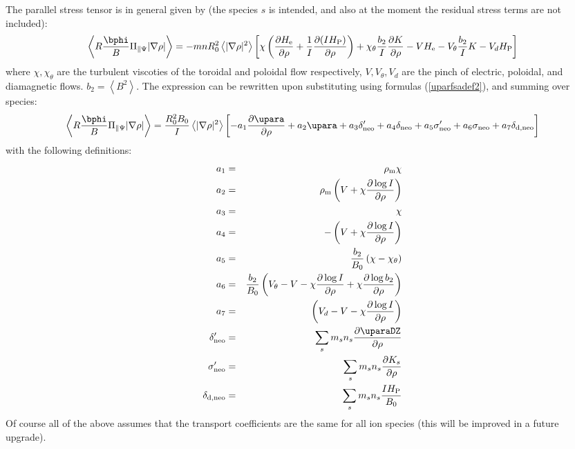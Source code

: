 The parallel stress tensor is in general given by (the species $s$ is intended, and also at the moment the residual stress terms are not included):
\begin{eqnarray}
\left\langle R \frac{\bphi}{B} \Pi_{\parallel\Psi}
|\nabla{\rho}| \right\rangle=-m n R_0^2\left\langle |\nabla{\rho}|^2 \right\rangle \left[\chi \left(\frac{\partial H_{\rm e}}{\partial\rho}+\frac{1}{I}\frac{\partial (I H_{\rm P})}{\partial\rho}\right)+\chi_\theta \frac{b_2}{I}\frac{\partial K}{\partial\rho}-V H_{\rm e}-V_\theta \frac{b_2}{I} K -V_d H_{\rm P}\right]
\label{parallelstresstensor}
\end{eqnarray}
where $\chi,\chi_\theta$ are the turbulent viscoties of the toroidal and poloidal flow respectively, $V,V_\theta,V_d$ are the pinch of electric, poloidal, and diamagnetic flows. $b_2=\left\langle B^2 \right\rangle$.
The expression can be rewritten upon substituting using formulas (\ref{uparfsadef2}), and summing over species:
\begin{eqnarray}
\left\langle R \frac{\bphi}{B} \Pi_{\parallel\Psi}
|\nabla{\rho}| \right\rangle= \frac{R_0^2 B_0}{I} \left\langle |\nabla{\rho}|^2 \right\rangle \left[-a_1 \frac{\partial \upara}{\partial\rho}+a_2\upara+a_3\delta_{\rm neo}'+a_4\delta_{\rm neo} +a_5 \sigma_{\rm neo}'+a_6\sigma_{\rm neo}+a_7 \delta_{\rm d,neo}\right]
\label{parallelstresstensor2}
\end{eqnarray}
with the following definitions:
\begin{eqnarray}
a_1 &=& \rho_{\rm m} \chi
\nonumber \\
a_2 &=& \rho_{\rm m} \left(V+\chi \frac{\partial \log{I}}{\partial \rho}  \right)
\nonumber \\
a_3 &=& \chi
\nonumber \\
a_4 &=& -\left(V+\chi \frac{\partial \log{I}}{\partial \rho}  \right)
\nonumber \\
a_5 &=& \frac{b_2}{B_0}\left(\chi-\chi_\theta \right)
\nonumber \\
a_6 &=& \frac{b_2}{B_0}\left(V_\theta-V-\chi \frac{\partial \log{I}}{\partial \rho}+\chi\frac{\partial \log{b_2}}{\partial \rho} \right)
\nonumber \\
a_7 &=& \left(V_d-V-\chi\frac{\partial \log{I}}{\partial \rho}  \right)
\nonumber \\
\delta_{\rm neo}' &=& \sum_s m_s n_s \frac{\partial \uparaDZ}{\partial\rho}
\nonumber \\
\sigma_{\rm neo}' &=& \sum_s m_s n_s \frac{\partial K_s}{\partial\rho}
\nonumber \\
\delta_{\rm d,neo} &=& \sum_s m_s n_s \frac{I H_{\rm P}}{B_0}
\label{stresstensorparperp2quantities}
\end{eqnarray}
Of course all of the above assumes that the transport coefficients are the same for all ion species (this will be improved in a future upgrade).

